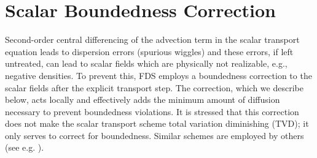 %



\chapter{Scalar Boundedness Correction}
\label{app_boundedness}

Second-order central differencing of the advection term in the scalar transport equation leads to dispersion errors (spurious wiggles) and these errors, if left untreated, can lead to scalar fields which are physically not realizable, e.g., negative densities.  To prevent this, FDS employs a boundedness correction to the scalar fields after the explicit transport step.  The correction, which we describe below, acts locally and effectively adds the minimum amount of diffusion necessary to prevent boundedness violations.  It is stressed that this correction does not make the scalar transport scheme total variation diminishing (TVD); it only serves to correct for boundedness. Similar schemes are employed by others (see e.g. \cite{Herrmann:2005}).

